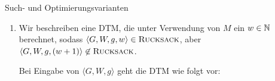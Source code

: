 \documentclass[answers]{submit}
\begin{document}
\begin{exercise}[12]{Such- und Optimierungsvarianten}
{\begin{enumerate}
            \begin{enumerate}
              \item $idx \gets 1$, $S \gets \{1,\dots,n\}$
              \item Solange $idx \leq n$: \label{while}
                    \begin{enumerate}
                      \item Prüfe, ob $\langle \{g_i|g\in S \setminus \{idx\}\}, \{w_i|w\in S \setminus \{idx\}\}, g, w\rangle \in \textsc{Rucksack}$ mit $\RO$:
                            \begin{enumerate}
                              \item Falls ja, dann $S \gets S \setminus \{idx\}$
                            \end{enumerate}
                      \item $idx \gets idx + 1$
                    \end{enumerate}
              \item Schreibe $S$ auf das Band
            \end{enumerate}

            Schleifeninvariante: Nach jeden Durchlauf von \ref{while} gilt:

            Für jedes $S'$, mit $S'=S\setminus \{n\}$ mit $n\in \{1,\dots,idx - 1\}$ gilt:

            $$\langle \{g_i|g\in S'\}, \{w_i|w\in S'\}, g, w\rangle \notin \textsc{Rucksack}$$

            Und $$\langle \{g_i|g\in S\}, \{w_i|w\in S\}, g, w\rangle \in \textsc{Rucksack}$$

            Nachdem $idx = n + 1$ gilt, ist $S$ eine solche gesuchte Menge, da es keine strikten
            Untermengen von $S$ gibt, die in $\textsc{Rucksack}$ lägen, aber $S$ selbst in $\textsc{Rucksack}$ liegt.

            Der Algorithmus geht $n$ mal durch die Schleife, und für jeden Durchlauf wird $\RO$ genau einmal aufgerufen.

            Der Algorithmus ist offensichtlich polynomiell in der Eingabe.

      \item Wir beschreiben eine DTM, die unter Verwendung von $M$ ein $w\in \mathbb{N}$ berechnet,
            sodass $\langle G,W,g,w\rangle\in \textsc{Rucksack}$,
            aber $\langle G,W,g,(w+1)\rangle\not\in \textsc{Rucksack}$.

            Bei Eingabe von $\langle G,W,g\rangle$ geht die DTM wie folgt vor:


\end{enumerate}}
\end{exercise}
\end{document}
